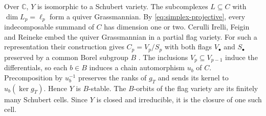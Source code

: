 Over $\mathbb C$, $Y$ is isomorphic to a Schubert variety.
The subcomplexes $L\subseteq C$ with $\dim L_p=\ell_p$ form a quiver Grassmannian.
By \eqref{eq:simplex-projective}, every indecomposable summand of $C$ has
dimension one or two. Cerulli Irelli, Feigin and Reineke embed the quiver
Grassmannian in a partial flag variety. For such a representation their
construction gives $C_p=V_p/S_p$ with both flags $V_\bullet$ and
$S_\bullet$ preserved by a common Borel subgroup $B$
\cite[Example~1.3, Proposition~2.1 and Theorem~2.2]{SchubertQuiver}.
The inclusions $V_p\subseteq V_{p-1}$
induce the differentials, so each $b\in B$ induces a chain automorphism
$u_b$ of $C$. Precomposition by $u_b^{-1}$ preserves the ranks of
$g_T$ and sends its kernel to $u_b(\ker g_T)$. Hence $Y$ is $B$-stable.
The $B$-orbits of the flag variety are its finitely many Schubert cells.
Since $Y$ is closed and irreducible, it is the closure of one such cell.

